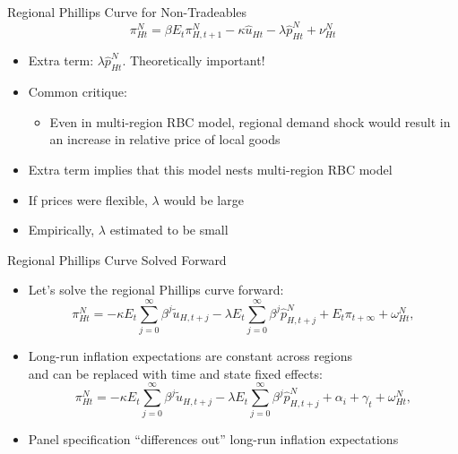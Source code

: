 \documentclass[11pt,aspectratio=169,xcolor={dvipsnames},hyperref={pdftex,pdfpagemode=UseNone,hidelinks,pdfdisplaydoctitle=true},usepdftitle=false]{beamer}
\begin{document}
\begin{frame}{Regional Phillips Curve for Non-Tradeables}
	\[\pi^N_{Ht}=\beta E_{t}\pi^N_{H,t+1}-\kappa\hat{u}_{Ht} - \lambda \hat{p}^N_{Ht} + \nu^N_{Ht} \]
	\vspace{-10pt}
	\begin{itemize}
		\itemsep1em 
		\item Extra term: $\lambda \hat{p}^N_{Ht}$. Theoretically important!
		\item Common critique:
		\begin{itemize}
			\item Even in multi-region RBC model, regional demand shock would result in an increase in relative price of local goods
		\end{itemize}
		\item Extra term implies that this model nests multi-region RBC model
		\item If prices were flexible, $\lambda$ would be large
		\item Empirically, $\lambda$ estimated to be small
	\end{itemize}
\end{frame}


\begin{frame}{Regional Phillips Curve Solved Forward}
	\begin{itemize}
		\itemsep1.5em 
		\item Let's solve the regional Phillips curve forward:
		\[\pi_{Ht}^N = - \kappa E_{t} \sum_{j=0}^{\infty} \beta^j  \tilde{u}_{H,t+j} - \lambda E_{t} \sum_{j=0}^{\infty} \beta^j \hat{p}_{H,t+j}^N + E_{t}\pi_{t+\infty} + \omega_{Ht}^N, \]
		\item Long-run inflation expectations are constant across regions \\ and can be replaced with time and state fixed effects:
		\[\pi_{Ht}^N = - \kappa E_{t} \sum_{j=0}^{\infty} \beta^j  \tilde{u}_{H,t+j} - \lambda E_{t} \sum_{j=0}^{\infty} \beta^j \hat{p}_{H,t+j}^N + \alpha_i + \gamma_t + \omega_{Ht}^N, \]
		\item Panel specification ``differences out'' long-run inflation expectations
	\end{itemize}
\end{frame}
\end{document}
